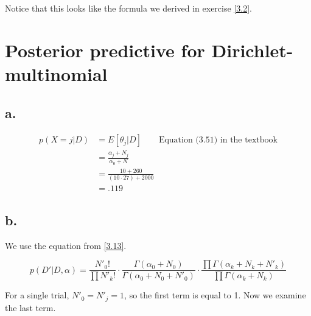 \documentclass{article}
\begin{document}
Notice that this looks like the formula we derived in exercise
\ref{3.2}.

\section{Posterior predictive for Dirichlet-multinomial}

\subsection{a.}

\begin{align*}
  p(X=j|D) &= E[\theta_j|D] \qquad \text{Equation (3.51) in the
  textbook} \\
           &= \frac{\alpha_j + N_j}{\alpha_0 + N} \\
           &= \frac{10 + 260}{(10 \cdot 27) + 2000} \\
           &= .119
\end{align*}

\subsection{b.}

We use the equation from \ref{3.13}.

\begin{equation*}
  p(D'|D,\alpha) = \frac{N'_0!}{\prod N'_k!} \cdot \frac{\Gamma(\alpha_0 +
                   N_0)}{\Gamma(\alpha_0 + N_0 + N'_0)} \cdot
                   \frac{\prod \Gamma(\alpha_k + N_k + N'_k)}{\prod
                   \Gamma(\alpha_k + N_k)}
\end{equation*}

For a single trial, $ N'_0 = N'_j= 1$, so the first term is equal to
1. Now we examine the last term.
\end{document}
